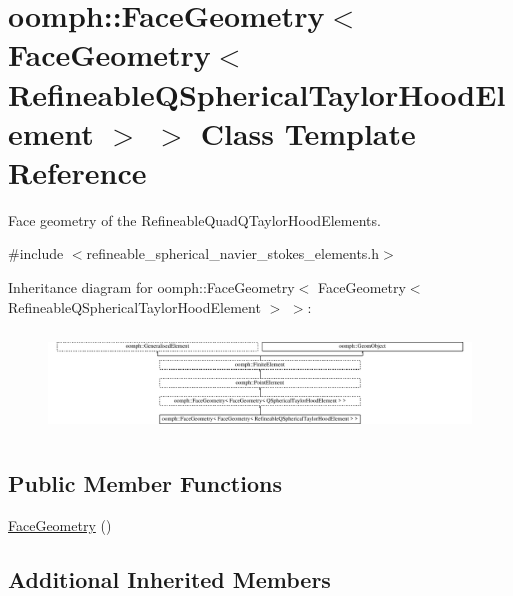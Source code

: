 \hypertarget{classoomph_1_1FaceGeometry_3_01FaceGeometry_3_01RefineableQSphericalTaylorHoodElement_01_4_01_4}{}\section{oomph\+:\+:Face\+Geometry$<$ Face\+Geometry$<$ Refineable\+Q\+Spherical\+Taylor\+Hood\+Element $>$ $>$ Class Template Reference}
\label{classoomph_1_1FaceGeometry_3_01FaceGeometry_3_01RefineableQSphericalTaylorHoodElement_01_4_01_4}


Face geometry of the Refineable\+Quad\+Q\+Taylor\+Hood\+Elements.  




{\ttfamily \#include $<$refineable\+\_\+spherical\+\_\+navier\+\_\+stokes\+\_\+elements.\+h$>$}

Inheritance diagram for oomph\+:\+:Face\+Geometry$<$ Face\+Geometry$<$ Refineable\+Q\+Spherical\+Taylor\+Hood\+Element $>$ $>$\+:\begin{figure}[H]
\begin{center}
\leavevmode
\includegraphics[height=2.739726cm]{classoomph_1_1FaceGeometry_3_01FaceGeometry_3_01RefineableQSphericalTaylorHoodElement_01_4_01_4}
\end{center}
\end{figure}
\subsection*{Public Member Functions}
\begin{DoxyCompactItemize}
\item 
\hyperlink{classoomph_1_1FaceGeometry_3_01FaceGeometry_3_01RefineableQSphericalTaylorHoodElement_01_4_01_4_ae0fb9c43b6ae74a28c7bf34c08645ddc}{Face\+Geometry} ()
\end{DoxyCompactItemize}
\subsection*{Additional Inherited Members}


